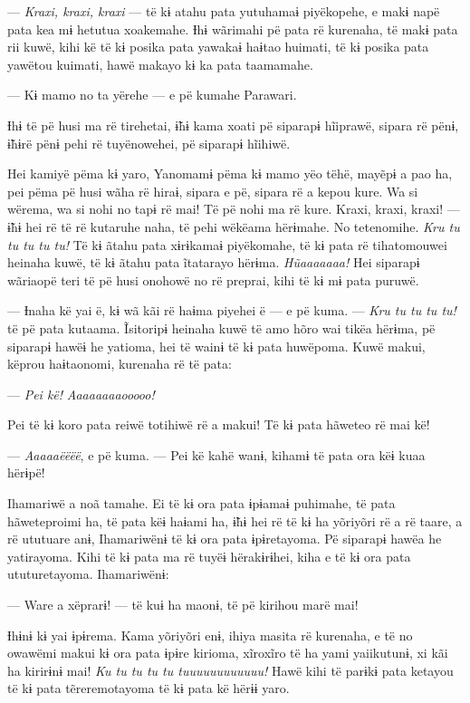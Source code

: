 --- \textit{Kraxi, kraxi, kraxi} --- të kɨ atahu pata yutuhamaɨ piyëkopehe, e
makɨ napë pata kea mɨ hetutua xoakemahe. Ɨhɨ wãrimahi pë pata rë
kurenaha, të makɨ pata rii kuwë, kihi kë të kɨ posika pata yawakaɨ
haɨtao huimati, të kɨ posika pata yawëtou kuimati, hawë makayo kɨ ka
pata taamamahe. 

--- Kɨ mamo no ta yërehe --- e pë kumahe Parawari. 

Ɨhɨ të pë husi ma rë tirehetai, ɨ̃hɨ kama xoati pë siparapɨ hĩiprawë,
sipara rë pënɨ, ɨ̃hɨrë pënɨ pehi rë tuyënowehei, pë siparapɨ hĩihiwë. 

Hei kamiyë pëma kɨ yaro, Yanomamɨ pëma kɨ mamo yëo tëhë, mayẽpɨ a pao
ha, pei pëma pë husi wãha rë hiraɨ, sipara e pë, sipara rë a kepou kure.
Wa si wërema, wa si nohi no tapɨ rë mai! Të pë nohi ma rë kure. Kraxi,
kraxi, kraxi! --- ɨ̃hɨ hei rë të rë kutaruhe naha, të pehi wëkëama
hërɨmahe. No tetenomihe. \textit{Kru tu tu tu tu tu!} Të kɨ ãtahu pata xɨrɨkamaɨ
piyëkomahe, të kɨ pata rë tihatomouwei heinaha kuwë, të kɨ ãtahu pata
ĩtatarayo hërɨma. \textit{Hũaaaaaaa!} Hei siparapɨ wãriaopë teri të pë husi
onohowë no rë preprai, kihi të kɨ mɨ pata puruwë. 

--- Ɨnaha kë yai ë, kɨ wã kãi rë haɨma piyehei ë --- e pë kuma. --- \textit{Kru
tu tu tu tu!} të pë pata kutaama. Ĩsitoripɨ heinaha kuwë të amo hõro wai
tikëa hërɨma, pë siparapɨ hawëɨ he yatioma, hei të wainɨ të kɨ pata
huwëpoma. Kuwë makui, këprou haɨtaonomi, kurenaha rë të pata:

--- \textit{Pei kë!} \textit{Aaaaaaaaooooo!} 

Pei të kɨ koro pata reiwë totihiwë rë a makui! Të kɨ pata hãweteo rë mai
kë! 

--- \textit{Aaaaaëëëë}, e pë kuma. --- Pei kë kahë wanɨ, kihamɨ të pata ora këɨ
kuaa hërɨpë! 

Ihamariwë a noã tamahe. Ei të kɨ ora pata ɨpɨamaɨ puhimahe, të pata
 hãweteproimi ha, të pata këɨ haɨami ha, ɨ̃hɨ hei rë të kɨ ha yõriyõri rë
 a rë taare, a rë ututuare anɨ, Ihamariwënɨ të kɨ ora pata ɨpɨretayoma.
 Pë siparapɨ hawëa he yatirayoma. Kihi të kɨ pata ma rë tuyëɨ
 hërakɨrɨhei, kiha e të kɨ ora pata ututuretayoma. Ihamariwënɨ: 

--- Ware a xëprarɨ! --- të kuɨ ha maonɨ, të pë kirihou marë mai!

Ɨhɨnɨ kɨ yai ɨpɨrema. Kama yõriyõri enɨ, ihiya masita rë kurenaha, e të
no owawëmi makui kɨ ora pata ɨpɨre kirioma, xĩroxĩro të ha yami
yaiikutunɨ, xi kãi ha kirirɨnɨ mai! \textit{Ku tu tu tu tu tuuuuuuuuuuuu!} Hawë
kihi të parɨkɨ pata ketayou të kɨ pata tẽreremotayoma të kɨ pata kë
hërɨɨ yaro. 

